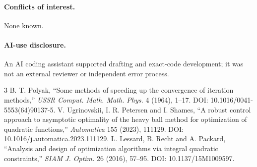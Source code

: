 \documentclass[9pt]{extarticle}
\begin{document}
\paragraph{Conflicts of interest.} None known.
\paragraph{AI-use disclosure.} An AI coding assistant supported drafting and
exact-code development; it was not an external reviewer or independent error
process.

\begin{thebibliography}{3}
 B. T. Polyak, ``Some methods of speeding up the convergence of
iteration methods,'' \emph{USSR Comput. Math. Math. Phys.} 4 (1964), 1--17.
DOI: 10.1016/0041-5553(64)90137-5.
 V. Ugrinovskii, I. R. Petersen and I. Shames, ``A robust
control approach to asymptotic optimality of the heavy ball method for
optimization of quadratic functions,'' \emph{Automatica} 155 (2023), 111129.
DOI: 10.1016/j.automatica.2023.111129.
 L. Lessard, B. Recht and A. Packard, ``Analysis and design of
optimization algorithms via integral quadratic constraints,'' \emph{SIAM J.
Optim.} 26 (2016), 57--95. DOI: 10.1137/15M1009597.
\end{thebibliography}
\end{document}
